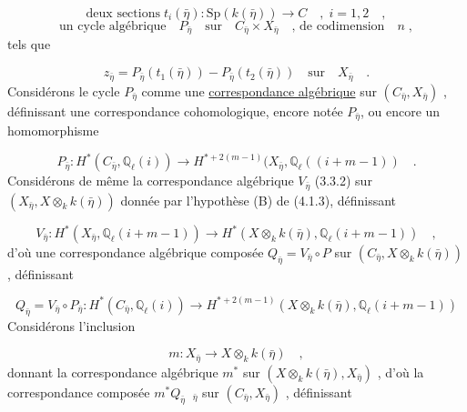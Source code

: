 
\begin{equation}\tag{4.4.3}
 \text{deux sections} \; t_{i}(\bar{\eta}) : \mathrm{Sp}(k(\bar{\eta})) \longrightarrow C \quad , \; i=1,2 \quad ,
\end{equation}
\begin{equation}\tag{4.4.4}
\text{un cycle algébrique} \quad P_{\bar{\eta}} \quad \text{sur} \quad C_{\bar{\eta}} \times X_{\bar{\eta}} \quad \text{, de codimension} \quad n \; ,
\end{equation}
tels que

\begin{equation}\tag{4.4.5}
z_{\bar{\eta}} = P_{\bar{\eta}}(t_{1}(\bar{\eta})) - P_{\bar{\eta}}(t_{2}(\bar{\eta})) \quad \text{sur} \quad X_{\bar{\eta}} \quad .
\end{equation}
Considérons le cycle $P_{\bar{\eta}}$ comme une \underline{correspondance algébrique} sur $(C_{\bar{\eta}}, X_{\bar{\eta}})$ , définissant une correspondance cohomologique, encore notée $P_{\bar{\eta}}$, ou encore un homomorphisme

\begin{equation}\tag{4.4.6}
P_{\bar{\eta}} : H^{*}(C_{\bar{\eta}},\mathbb{Q}_{\ell}(i)) \longrightarrow H^{*+2(m-1)}(X_{\bar{\eta}}, \mathbb{Q}_{\ell}((i+m-1)) \quad .
\end{equation}
Considérons de même la correspondance algébrique $V_{\bar{\eta}}$ (3.3.2) sur $(X_{\bar{\eta}}, X \otimes_{k} k(\bar{\eta}))$ donnée par l'hypothèse (B) de (4.1.3), définissant

\begin{equation}\tag{4.4.7}
V_{\bar{\eta}} : H^{*}(X_{\bar{\eta}}, \mathbb{Q}_{\ell}(i+m-1)) \longrightarrow H^{*}(X\otimes_{k}k(\bar{\eta}), \mathbb{Q}_{\ell}(i+m-1)) \quad ,
\end{equation}
d'où une correspondance algébrique composée $Q_{\bar{\eta}} = V_{\bar{\eta}} \circ P$ sur $(C_{\bar{\eta}}, X \otimes_{k} k(\bar{\eta}))$ , définissant

\begin{equation}\tag{4.4.8}
Q_{\bar{\eta}} = V_{\bar{\eta}} \circ P_{\bar{\eta}} : H^{*}(C_{\bar{\eta}},\mathbb{Q}_{\ell}(i)) \longrightarrow H^{*+2(m-1)}(X\otimes_{k}k(\bar{\eta}),\mathbb{Q}_{\ell}(i+m-1))
\end{equation}
Considérons l'inclusion

\begin{equation*}
m : X_{\bar{\eta}} \longrightarrow X \otimes_{k} k(\bar{\eta}) \quad ,
\end{equation*}
donnant la correspondance algébrique $m^{*}$ sur $(X \otimes_{k} k(\bar{\eta}), X_{\bar{\eta}})$ , d'où la correspondance composée $m^{*} Q_{\bar{\eta}} \;\; {}_{\bar{\eta}}$ sur $(C_{\bar{\eta}}, X_{\bar{\eta}})$ , définissant 


